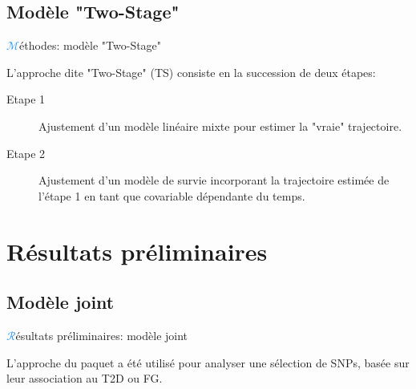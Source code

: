 \subsection{Modèle "Two-Stage"}
\begin{frame}{{\huge\textcolor{dodgerblue}{$\mathcal{M}$}}éthodes: modèle "Two-Stage"}
\par{L'approche dite "Two-Stage" (\textcolor{springgreen3}{TS}) \textcolor{dodgerblue}{\citep{self_modeling_1992}} consiste en la succession de deux étapes:
\begin{description}
    \item[Etape 1] Ajustement d'un modèle linéaire mixte pour estimer la "vraie" trajectoire.
    \item[Etape 2] Ajustement d'un modèle de survie incorporant la trajectoire estimée de l'étape 1
    en tant que covariable dépendante du temps.
\end{description}
}
\end{frame}

\section{Résultats préliminaires}
\subsection{Modèle joint}
\begin{frame}{{\huge\textcolor{dodgerblue}{$\mathcal{R}$}}ésultats préliminaires: modèle joint}
\par{L'approche du paquet  a été utilisé pour analyser une sélection de \textcolor{springgreen3}{SNP}s, basée sur leur association
au \textcolor{springgreen3}{T2D} ou \textcolor{springgreen3}{FG}.
\begin{center}
\end{center}
}
\end{frame}

